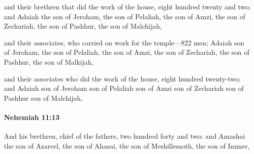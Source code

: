 			\begin{versebox}
					\item[BHS] 
					\item[LXX] 
					\item[ASV] and their brethren that did the work of the house, eight hundred twenty and two; and Adaiah the son of Jeroham, the son of Pelaliah, the son of Amzi, the son of Zechariah, the son of Pashhur, the son of Malchijah,
					\item[NIV] and their associates, who carried on work for the temple—822 men; Adaiah son of Jeroham, the son of Pelaliah, the son of Amzi, the son of Zechariah, the son of Pashhur, the son of Malkijah,
					\item[NRSV] and their associates who did the work of the house, eight hundred twenty-two; and Adaiah son of Jeroham son of Pelaliah son of Amzi son of Zechariah son of Pashhur son of Malchijah,
			\end{versebox}

		\paragraph{Nehemiah 11:13} %
			\label{NEHEMIAH-11-13}

			And his brethren, chief of the fathers, two hundred forty and two: and Amashai the son of Azareel, the son of Ahasai, the son of Meshillemoth, the son of Immer,

